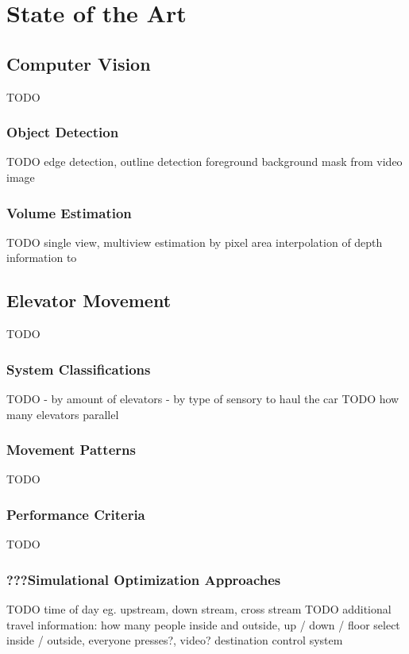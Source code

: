 \chapter{State of the Art}
\label{chap:sota}

\section{Computer Vision}

TODO

\subsection{Object Detection}

TODO
edge detection, outline detection
foreground background mask from video image

\subsection{Volume Estimation}

TODO
single view, multiview
estimation by pixel area
interpolation of depth information to 

\section{Elevator Movement}
TODO

\subsection{System Classifications}
TODO
- by amount of elevators
- by type of sensory to haul the car
TODO how many elevators parallel

\subsection{Movement Patterns}
TODO

\subsection{Performance Criteria}
TODO

\subsection{???Simulational Optimization Approaches}


TODO time of day eg. upstream, down stream, cross stream
TODO additional travel information: how many people inside and outside, up / down / floor select inside / outside, everyone presses?, video? 
destination control system

